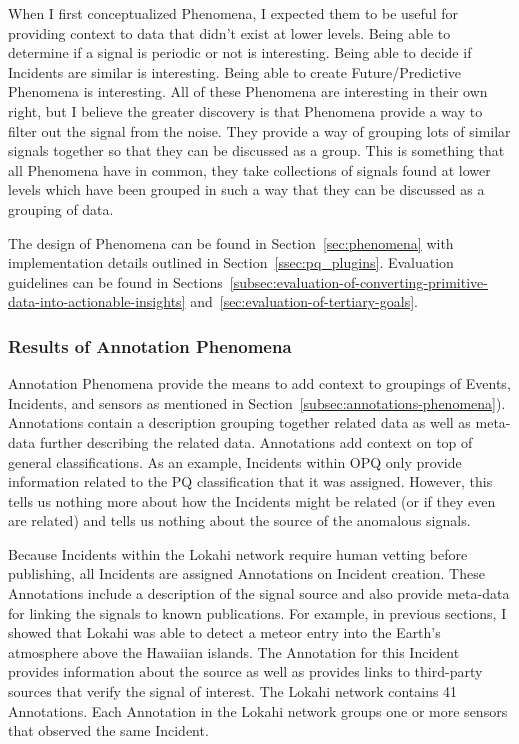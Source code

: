 When I first conceptualized Phenomena, I expected them to be useful for providing context to data that didn't exist at lower levels. Being able to determine if a signal is periodic or not is interesting. Being able to decide if Incidents are similar is interesting. Being able to create Future/Predictive Phenomena is interesting. All of these Phenomena are interesting in their own right, but I believe the greater discovery is that Phenomena provide a way to filter out the signal from the noise. They provide a way of grouping lots of similar signals together so that they can be discussed as a group. This is something that all Phenomena have in common, they take collections of signals found at lower levels which have been grouped in such a way that they can be discussed as a grouping of data.

The design of Phenomena can be found in Section~\ref{sec:phenomena} with implementation details outlined in Section~\ref{ssec:pq_plugins}. Evaluation guidelines can be found in Sections~\ref{subsec:evaluation-of-converting-primitive-data-into-actionable-insights} and~\ref{sec:evaluation-of-tertiary-goals}.

\subsubsection{Results of Annotation Phenomena}

Annotation Phenomena provide the means to add context to groupings of Events, Incidents, and sensors as mentioned in Section~\ref{subsec:annotations-phenomena}). Annotations contain a description grouping together related data as well as meta-data further describing the related data. Annotations add context on top of general classifications. As an example, Incidents within OPQ only provide information related to the PQ classification that it was assigned. However, this tells us nothing more about how the Incidents might be related (or if they even are related) and tells us nothing about the source of the anomalous signals.

Because Incidents within the Lokahi network require human vetting before publishing, all Incidents are assigned Annotations on Incident creation. These Annotations include a description of the signal source and also provide meta-data for linking the signals to known publications. For example, in previous sections, I showed that Lokahi was able to detect a meteor entry into the Earth's atmosphere above the Hawaiian islands. The Annotation for this Incident provides information about the source as well as provides links to third-party sources that verify the signal of interest. The Lokahi network contains 41 Annotations. Each Annotation in the Lokahi network groups one or more sensors that observed the same Incident.

